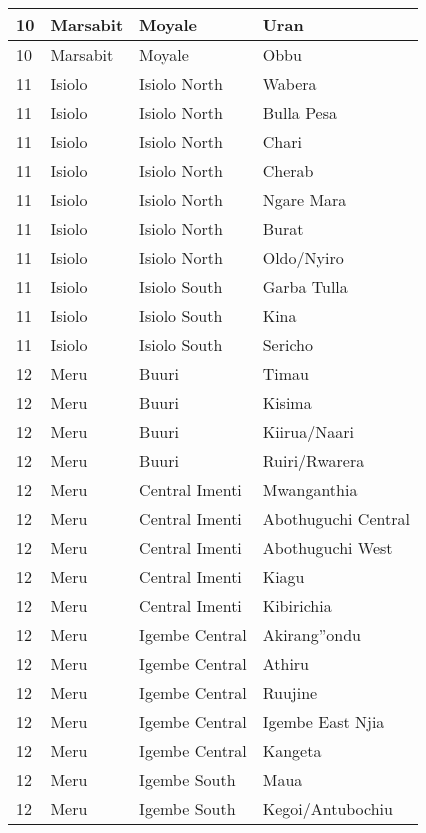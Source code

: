 \begin{table}[!ht]
\begin{tabular}{|l|l|l|l|}
        10 & Marsabit & Moyale & Uran \\ \hline
        10 & Marsabit & Moyale & Obbu \\ \hline
        11 & Isiolo & Isiolo North & Wabera \\ \hline
        11 & Isiolo & Isiolo North & Bulla Pesa \\ \hline
        11 & Isiolo & Isiolo North & Chari \\ \hline
        11 & Isiolo & Isiolo North & Cherab \\ \hline
        11 & Isiolo & Isiolo North & Ngare Mara \\ \hline
        11 & Isiolo & Isiolo North & Burat \\ \hline
        11 & Isiolo & Isiolo North & Oldo/Nyiro \\ \hline
        11 & Isiolo & Isiolo South & Garba Tulla \\ \hline
        11 & Isiolo & Isiolo South & Kina \\ \hline
        11 & Isiolo & Isiolo South & Sericho \\ \hline
        12 & Meru & Buuri & Timau \\ \hline
        12 & Meru & Buuri & Kisima \\ \hline
        12 & Meru & Buuri & Kiirua/Naari \\ \hline
        12 & Meru & Buuri & Ruiri/Rwarera \\ \hline
        12 & Meru & Central Imenti & Mwanganthia \\ \hline
        12 & Meru & Central Imenti & Abothuguchi Central \\ \hline
        12 & Meru & Central Imenti & Abothuguchi West \\ \hline
        12 & Meru & Central Imenti & Kiagu \\ \hline
        12 & Meru & Central Imenti & Kibirichia \\ \hline
        12 & Meru & Igembe Central & Akirang''ondu \\ \hline
        12 & Meru & Igembe Central & Athiru \\ \hline
        12 & Meru & Igembe Central & Ruujine \\ \hline
        12 & Meru & Igembe Central & Igembe East Njia \\ \hline
        12 & Meru & Igembe Central & Kangeta \\ \hline
        12 & Meru & Igembe South & Maua \\ \hline
        12 & Meru & Igembe South & Kegoi/Antubochiu \\ \hline

\end{tabular}
\end{table}
